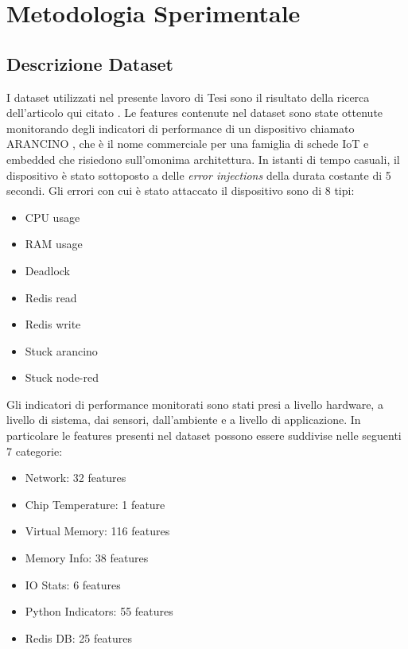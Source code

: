 \chapter{Metodologia Sperimentale}

\medskip

\section{Descrizione Dataset}
I dataset utilizzati nel presente lavoro di Tesi sono il risultato della ricerca dell'articolo qui citato \cite{zoppi}. Le features contenute nel dataset sono state ottenute monitorando degli indicatori di performance di un dispositivo chiamato ARANCINO \cite{arancino}, che \`e il nome commerciale per una famiglia di schede IoT e embedded che risiedono sull'omonima architettura. In istanti di tempo casuali, il dispositivo \`e stato sottoposto a delle \textit{error injections} della durata costante di 5 secondi. Gli errori con cui \`e stato attaccato il dispositivo sono di 8 tipi:

\begin{itemize}
    \item CPU usage
    \item RAM usage
    \item Deadlock
    \item Redis read
    \item Redis write
    \item Stuck arancino
    \item Stuck node-red
\end{itemize}


Gli indicatori di performance monitorati sono stati presi a livello hardware, a livello di sistema, dai sensori, dall'ambiente e a livello di applicazione. In particolare le features presenti nel dataset possono essere suddivise nelle seguenti 7 categorie:

\begin{itemize}
    \item Network: 32 features
    \item Chip Temperature: 1 feature
    \item Virtual Memory: 116 features
    \item Memory Info: 38 features
    \item IO Stats: 6 features
    \item Python Indicators: 55 features
    \item Redis DB: 25 features
\end{itemize}

